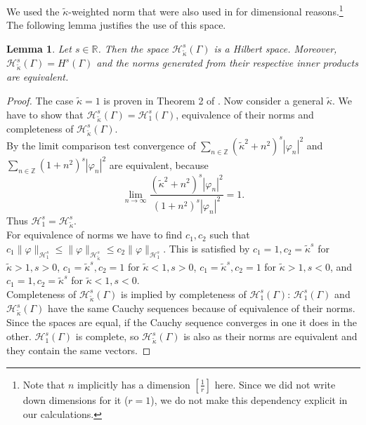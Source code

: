 \documentclass[12pt,journal,compsoc, onecolumn]{IEEEtran}
\newtheorem{lemma}[theorem]{Lemma}
\begin{document}
We used the $\tilde \kappa$-weighted norm that were also used in \cite{hiptmair2021spurious} for dimensional reasons.\footnote{Note that $n$ implicitly has a dimension $[\frac{1}{r}]$ here. Since we did not write down dimensions for it ($r = 1$), we do not make this dependency explicit in our calculations.} 
The following lemma justifies the use of this space.
\begin{lemma}
Let \(s \in \mathbb{R}\). Then the space \(\mathcal{H}^{s}_{\tilde \kappa}(\Gamma)\) is a Hilbert space. Moreover, \(\mathcal{H}^{s}_{\tilde \kappa}(\Gamma) = H^{s}(\Gamma)\) and the norms generated from their respective inner products are equivalent. 
\end{lemma}
\begin{proof}
    The case $\tilde \kappa = 1$ is proven in Theorem 2 of \cite{amini1998preconditioned}. Now consider a general $\tilde \kappa$. We have to show that $\mathcal{H}^{s}_{\tilde \kappa}(\Gamma)= \mathcal{H}^{s}_{1}(\Gamma)$, equivalence of their norms and completeness of $\mathcal{H}^{s}_{\tilde \kappa}(\Gamma)$. \\
    By the limit comparison test convergence of $\sum\limits_{n \in \mathbb{Z}}\left(\tilde \kappa^2+n^{2}\right)^{s}\left|\varphi_{n}\right|^{2}$ and $\sum\limits_{n \in \mathbb{Z}}\left(1+n^{2}\right)^{s}\left|\varphi_{n}\right|^{2}$ are equivalent, because $$\lim\limits_{n \rightarrow \infty} \frac{\left(\tilde \kappa^2+n^{2}\right)^{s}\left|\varphi_{n}\right|^{2}}{\left(1+n^{2}\right)^{s}\left|\varphi_{n}\right|^{2}} = 1.$$ Thus $\mathcal{H}^{s}_{1} = \mathcal{H}^{s}_{\tilde \kappa}$. \\
    For equivalence of norms we have to find $c_1, c_2$ such that 
    $c_1 \|\varphi\|_{\mathcal{H}^s_{1}} \leq \|\varphi\|_{\mathcal{H}^s_{\tilde{\kappa}}} \leq c_2 \|\varphi\|_{\mathcal{H}^s_{1}}$. This is satisfied by $c_1 = 1, c_2 = \tilde \kappa^s$ for $\tilde\kappa > 1, s > 0$, $c_1 =\tilde \kappa^s, c_2 = 1$ for $\tilde\kappa < 1, s > 0$,
    $c_1 = \tilde \kappa^s, c_2 = 1$ for $\tilde\kappa > 1, s < 0$,
    and $c_1 =1, c_2 =\tilde \kappa^s$ for $\tilde\kappa < 1, s < 0$. \\
    Completeness of $\mathcal{H}^{s}_{\tilde \kappa}(\Gamma)$ is implied by completeness of $\mathcal{H}^{s}_{1}(\Gamma)$:   $\mathcal{H}^{s}_{1}(\Gamma)$ and $\mathcal{H}^{s}_{\tilde \kappa}(\Gamma)$ have the same Cauchy sequences because of equivalence of their norms. Since the spaces are equal, if the Cauchy sequence converges in one it does in the other. $\mathcal{H}^{s}_{1}(\Gamma)$ is complete, so  $\mathcal{H}^{s}_{\tilde \kappa}(\Gamma)$ is also as their norms are equivalent and they contain the same vectors.
\end{proof}  \noindent
\end{document}
